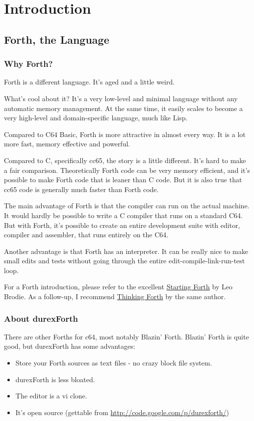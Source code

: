 \chapter{Introduction}

\section{Forth, the Language}

\subsection{Why Forth?}

Forth is a different language. It's aged and a little weird.

What's cool about it? It's a very low-level and minimal language without any automatic memory management. At the same time, it easily scales to become a very high-level and domain-specific language, much like Lisp. 

Compared to C64 Basic, Forth is more attractive in almost every way. It is a lot more fast, memory effective and powerful.

Compared to C, specifically cc65, the story is a little different. It's hard to make a fair comparison. Theoretically Forth code can be very memory efficient, and it's possible to make Forth code that is leaner than C code. But it is also true that cc65 code is generally much faster than Forth code.

The main advantage of Forth is that the compiler can run on the actual machine. It would hardly be possible to write a C compiler that runs on a standard C64. But with Forth, it's possible to create an entire development suite with editor, compiler and assembler, that runs entirely on the C64.

Another advantage is that Forth has an interpreter. It can be really nice to make small edits and tests without going through the entire edit-compile-link-run-test loop.

For a Forth introduction, please refer to the excellent \href{http://www.forth.com/starting-forth/}{Starting Forth} by Leo Brodie. As a follow-up, I recommend \href{http://thinking-forth.sourceforge.net/}{Thinking Forth} by the same author.

\subsection{About durexForth}

There are other Forths for c64, most notably Blazin' Forth. Blazin' Forth is quite good, but durexForth has some advantages:

\begin{itemize}
\item Store your Forth sources as text files - no crazy block file system.
\item durexForth is less bloated.
\item The editor is a vi clone.
\item It's open source (gettable from \url{http://code.google.com/p/durexforth/})
\end{itemize}
